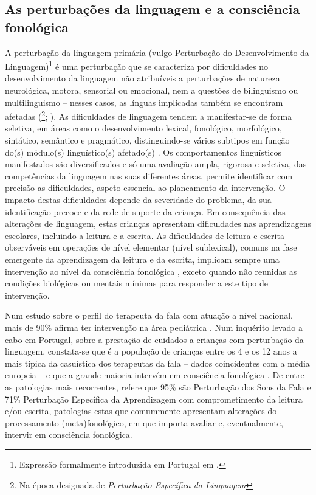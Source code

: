 \documentclass[output=paper,colorlinks,citecolor=brown,booklanguage=portuguese]{langscibook}
\begin{document}
\subsection{As perturbações da linguagem e a consciência fonológica}\label{sec:cap10sec1.2}
A perturbação da linguagem primária (vulgo Perturbação do Desenvolvimento da Linguagem)\footnote{Expressão formalmente introduzida em Portugal em \citet{Castro2019}.} é uma perturbação que se caracteriza por dificuldades no desenvolvimento da linguagem não atribuíveis a perturbações de natureza neurológica, motora, sensorial ou emocional, nem a questões de bilinguismo ou multilinguismo – nesses casos, as línguas implicadas também se encontram afetadas  (\citealp{Leonard1998}\footnote{Na época designada de \emph{Perturbação Específica da Linguagem}}; \citealp{Bishop2017}). As dificuldades de linguagem tendem a manifestar-se de forma seletiva, em áreas como o desenvolvimento lexical, fonológico, morfológico, sintático, semântico e pragmático, distinguindo-se vários subtipos em função do(s) módulo(s) linguístico(s) afetado(s) \citep{Rapin1996, Friedmann2008}. Os comportamentos linguísticos manifestados são diversificados e só uma avaliação ampla, rigorosa e seletiva, das competências da linguagem nas suas diferentes áreas, permite identificar com precisão as dificuldades, aspeto essencial ao planeamento da intervenção. O impacto destas dificuldades depende da severidade do problema, da sua identificação precoce e da rede de suporte da criança. Em consequência das alterações de linguagem, estas crianças apresentam dificuldades nas aprendizagens escolares, incluindo a leitura e a escrita. As dificuldades de leitura e escrita observáveis em operações de nível elementar (nível sublexical), comuns na fase emergente da aprendizagem da leitura e da escrita, implicam sempre uma intervenção ao nível da consciência fonológica \citep{Alves2014a}, exceto quando não reunidas as condições biológicas ou mentais mínimas para responder a este tipo de intervenção.

Num estudo sobre o perfil do terapeuta da fala com atuação a nível nacional, mais de 90\% afirma ter intervenção na área pediátrica \citep{Batista2011}. Num inquérito levado a cabo em Portugal, sobre a prestação de cuidados a crianças com perturbação da linguagem, constata-se que é a população de crianças entre os 4 e os 12 anos a mais típica da casuística dos terapeutas da fala -- dados coincidentes com a média europeia -- e que a grande maioria intervém em consciência fonológica \citep{Batista2011, Kunnari2017, Alves2018, Law2017}. De entre as patologias mais recorrentes, \citet{Batista2011} refere que 95\% são Perturbação dos Sons da Fala e 71\% Perturbação Específica da Aprendizagem com comprometimento da leitura e/ou escrita, patologias estas que comummente apresentam alterações do processamento (meta)fonológico, em que importa avaliar e, eventualmente, intervir em consciência fonológica.
\end{document}

